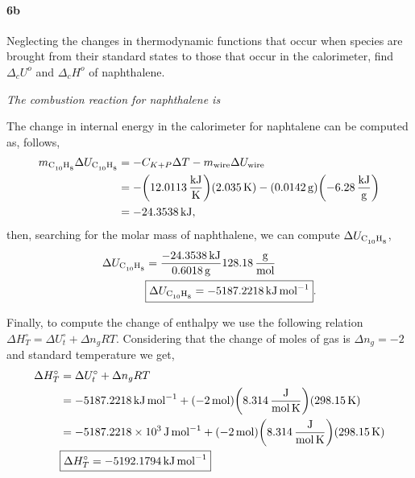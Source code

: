 \documentclass[main.tex]{subfiles}
\begin{document}
\paragraph{6b} Neglecting the changes in thermodynamic functions that occur when species are brought from their standard states to those that occur in the calorimeter, find $\Delta_c U^o$ and $\Delta_c H^o$ of naphthalene.

\textit{The combustion reaction for naphthalene is }

The change in internal energy in the calorimeter for naphtalene can be computed as, follows,
\begin{align*}
    m_{\ce{C10H8}}\Delta U_{\ce{C10H8}} &= -C_{K+P}\Delta T - m_{\mathrm{wire}}\Delta U_{\mathrm{wire}} \\
    &= -\qty(\SI[per-mode=fraction]{12.0113}{\kilo\joule\per\kelvin})\qty(\SI{2.035}{\kelvin}) - \qty(\SI[per-mode=fraction]{0.0142}{\gram})\qty(-\SI[per-mode=fraction]{6.28}{\kilo\joule\per\gram}) \\
    &=-\SI[per-mode=fraction]{24.3538}{\kilo\joule},
\end{align*}
then, searching for the molar mass of naphthalene, we can compute $\Delta U_{\ce{C10H8}}$,
\begin{align*}
    \Delta U_{\ce{C10H8}} &=\frac{-\SI[per-mode=fraction]{24.3538}{\kilo\joule}}{\SI{0.6018}{\gram}}\SI[per-mode=fraction]{128.18}{\gram\per\mole} \\
    &\boxed{\Delta U_{\ce{C10H8}}=-\SI{5187.2218}{\kilo\joule\per\mole}}.
\end{align*}

Finally, to compute the change of enthalpy we use the following relation $\Delta H_T^\circ = \Delta U_t^\circ + \Delta n_g RT$.
Considering that the change of moles of gas is $\Delta n_g = -2$ and standard temperature we get,
\begin{align*}
    \Delta H_T^\circ &= \Delta U_t^\circ + \Delta n_g RT \\
    &= -\SI{5187.2218}{\kilo\joule\per\mole} + \qty(-\SI{2}{\mole})\qty(\SI[per-mode=fraction]{8.314}{\joule\per\mole\per\kelvin})\qty(\SI{298.15}{\kelvin}) \\
    &= -\SI{5187.2218d3}{\joule\per\mole} + \qty(-\SI{2}{\mole})\qty(\SI[per-mode=fraction]{8.314}{\joule\per\mole\per\kelvin})\qty(\SI{298.15}{\kelvin}) \\
    &\boxed{\Delta H_T^\circ=-\SI{5192.1794}{\kilo\joule\per\mole}}
\end{align*}
\end{document}
